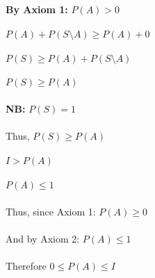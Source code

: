 \documentclass{article}
\begin{document}
\textbf{By Axiom 1:} $P(A) > 0$ \\ \\
$P(A) + P(S \setminus A) \geq P(A) + 0$
\\ \\
$P(S) \geq P(A) + P(S \setminus A)$
\\ \\
$P(S) \geq P(A)$
\\ \\
\textbf{NB:} $P(S) = 1$ 
\\ \\
Thus, $P(S) \geq P(A)$
\\ \\
$I > P(A)$
\\ \\
$P(A) \leq 1$
\\ \\
Thus, since Axiom 1: $P(A) \geq 0$
\\ \\
And by Axiom 2: $P(A) \leq 1$
\\ \\
Therefore $0 \leq P(A) \leq I$\\
\end{document}
